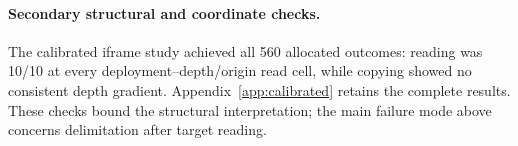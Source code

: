 \paragraph{Secondary structural and coordinate checks.}
The calibrated iframe study achieved all 560 allocated outcomes: reading was 10/10 at every deployment--depth/origin read cell, while copying showed no consistent depth gradient. Appendix~\ref{app:calibrated} retains the complete results. These checks bound the structural interpretation; the main failure mode above concerns delimitation after target reading.
